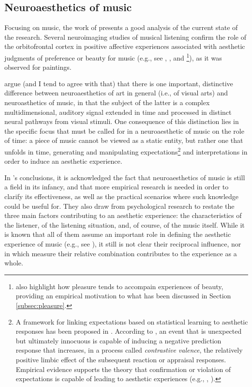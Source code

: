 \subsection{Neuroaesthetics of music}\label{subsec:music-neuroaesthetics}
Focusing on music, the work of \cite{brattico2013neuroaesthetics} presents a good analysis of the current state of the research. Several neuroimaging studies of musical listening confirm the role of the orbitofrontal cortex in positive affective experiences associated with aesthetic judgments of preference or beauty for music (e.g., see \cite{alluri2012large}, \cite{brattico2011functional}, and \cite{blood2001intensely}\footnote{\citeauthor{blood2001intensely} also highlight how pleasure tends to accompain experiences of beauty, providing an empirical motivation to what has been discussed in Section \ref{subsec:pleasure}.}), as it was observed for paintings.

\citeauthor{brattico2013neuroaesthetics} argue (and I tend to agree with that) that there is one important, distinctive difference between neuroaesthetics of art in general (i.e., of visual arts) and neuroasthetics of music, in that the subject of the latter is a complex multidimensional, auditory signal extended in time and processed in distinct neural pathways from visual stimuli. One consequence of this distinction lies in the specific focus that must be called for in a neuroaesthetic of music on the role of time: a piece of music cannot be viewed as a static entity, but rather one that unfolds in time, generating and manipulating expectations\footnote{A framework for linking expectations based on statistical learning to aesthetic responses has been proposed in \cite{huron2006sweet}. According to \citeauthor{huron2006sweet}, an event that is unexpected but ultimately innocuous is capable of inducing a negative prediction response that increases, in a process called \emph{contrastive valence}, the relatively positive limbic effect of the subsequent reaction or appraisal responses. Empirical evidence supports the theory that confirmation or violation of expectations is capable of leading to
aesthetic experiences (e.g., \cite{vitz1966affect}, \cite{crozier1974verbal}).} and interpretations in order to induce an aesthetic experience.

In \citeauthor{brattico2013neuroaesthetics}'s conclusions, it is acknowledged the fact that neuroaesthetics of music is still a field in its infancy, and that more empirical research is needed in order to clarify its effectiveness, as well as the practical scenarios where such knowledge could be useful for. They also draw from psychological research to restate the three main factors contributing to an aesthetic experience: the characteristics of the listener, of the listening situation, and, of course, of the music itself. While it is known that all of them assume an important role in defining the aesthetic experience of music (e.g., see \cite{hargreaves201021}), it still is not clear their reciprocal influence, nor in which measure their relative combination contributes to the experience as a whole.

